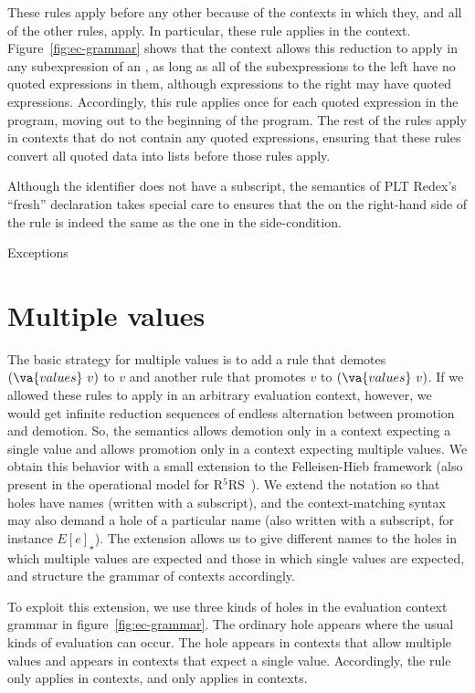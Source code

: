 These rules apply before any other because of the contexts in which they, and all of the other rules, apply. In particular, these rule applies in the
 context. Figure~\ref{fig:ec-grammar} shows that the
 context allows this reduction to apply in
any subexpression of an , as long as all of the
subexpressions to the left have no quoted expressions in them,
although expressions to the right may have quoted expressions.
Accordingly, this rule applies once for each quoted expression in the
program, moving out to the beginning of the program.
The rest of the rules apply in contexts that do not contain any quoted
expressions, ensuring that these rules convert all quoted data
into lists before those rules apply.

Although the identifier  does not have a subscript, the semantics of PLT Redex's ``fresh'' declaration takes special care to ensures that the  on the right-hand side of the rule is indeed the same as the one in the side-condition.

\beginfig
\begin{center}

\end{center}
\caption{Exceptions}\label{fig:Exceptions}
\endfig

\section{Multiple values}

The basic strategy for multiple values is to add a rule that demotes
$(\va{values}~v)$ to $v$ and another rule that promotes
$v$ to $(\va{values}~v)$. If we allowed these rules to apply
in an arbitrary evaluation context, however, we would get infinite
reduction sequences of endless alternation between promotion and
demotion. So, the semantics allows demotion only in a context
expecting a single value and allows promotion only in a context
expecting multiple values. We obtain this behavior with a small
extension to the Felleisen-Hieb framework (also present in the
operational model for R$^5$RS~\cite{mf:op-r5rs}).
We extend the notation so that
holes have names (written with a subscript), and the context-matching
syntax may also demand a hole of a particular name (also written with
a subscript, for instance $E[e]_{\star}$).  The extension
allows us to give different names to the holes in which multiple
values are expected and those in which single values are expected, and
structure the grammar of contexts accordingly.

To exploit this extension, we use three kinds of holes in the
evaluation context grammar in figure~\ref{fig:ec-grammar}. The
ordinary hole \hole{} appears where the usual kinds of
evaluation can occur. The hole \holes{} appears in contexts that
allow multiple values and \holeone{} appears in
contexts that expect a single value. Accordingly, the rule
 only applies in \holes{} contexts, and
 only applies in \holeone{} contexts.

